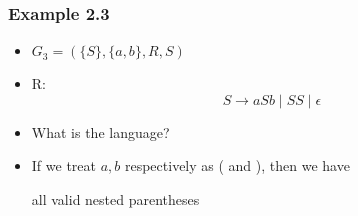 \begin{frame}[allowframebreaks] \frametitle{Example 2.3}
  \begin{itemize}

\item $G_3
=(\{S\}, \{a,b\}, R, S)$

\item[]  R:
\begin{equation*}
  S \rightarrow aSb\mid SS \mid \epsilon
\end{equation*}
\item What is the language?
\item If we treat $a, b$ respectively as ( and ), then
  we have
  \begin{center}
all valid nested parentheses
\end{center}
\end{itemize}\end{frame}



